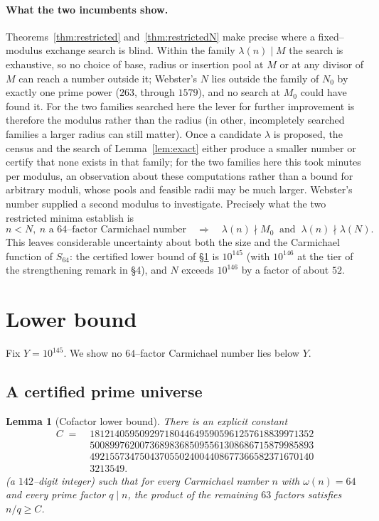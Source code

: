 \documentclass[11pt]{article}
\newtheorem{lemma}{Lemma}
\theoremstyle{definition}
\newcommand{\Smin}{S_{64}}
\begin{document}
\paragraph{What the two incumbents show.}
Theorems~\ref{thm:restricted} and~\ref{thm:restrictedN} make precise where a fixed--modulus
exchange search is blind. Within the family $\lambda(n)\mid M$ the search is exhaustive, so no
choice of base, radius or insertion pool at $M$ or at any divisor of $M$ can reach a number
outside it; Webster's $N$ lies outside the family of $N_0$ by exactly one prime power ($263$,
through $1579$), and no search at $M_0$ could have found it. For the two families searched here the
lever for further improvement is therefore the modulus rather than the radius (in other, incompletely
searched families a larger radius can still matter). Once a candidate $\lambda$ is proposed, the
census and the search of Lemma~\ref{lem:exact} either produce a smaller number or certify that none
exists in that family; for the two families here this took minutes per modulus, an observation about
these computations rather than a bound for arbitrary moduli, whose pools and feasible radii may be much
larger. Webster's number supplied a second modulus to investigate. Precisely what the two restricted
minima establish is
\[
  n<N,\ n\text{ a $64$--factor Carmichael number}\quad\Longrightarrow\quad
  \lambda(n)\nmid M_0\ \text{ and }\ \lambda(n)\nmid\lambda(N).
\]
This leaves considerable uncertainty about both the size and the Carmichael function of $\Smin$: the
certified lower bound of \S\ref{sec:lower} is $10^{145}$ (with $10^{146}$ at the tier of the
strengthening remark in \S4), and $N$ exceeds $10^{146}$ by a factor of about $52$.

\section{Lower bound}\label{sec:lower}

Fix $Y=10^{145}$. We show no $64$--factor Carmichael number lies below $Y$.

\subsection{A certified prime universe}

\begin{lemma}[Cofactor lower bound]\label{lem:C}
There is an explicit constant
\[
  \begin{aligned}
  C \;=\;{}& 181214059509297180446495905961257618839971352\\
  &500899762007368983685095561308686715879985893\\
  &492155734750437055024004408677366582371670140\\
  &3213549 .
\end{aligned}
\]
(a $142$--digit integer) such that for every Carmichael number $n$ with $\omega(n)=64$ and every
prime factor $q\mid n$, the product of the remaining $63$ factors satisfies $n/q\ge C$.
\end{lemma}
\end{document}
